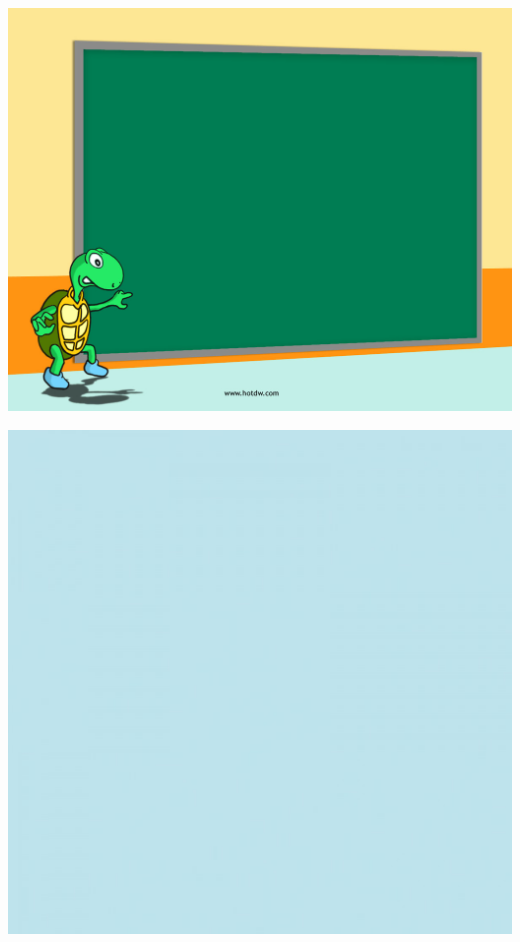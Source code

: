 \documentclass[mathserif, handout]{beamer}
\begin{document}
\usebackgroundtemplate
{
  \includegraphics[width=\paperwidth,height=\paperheight]{./figs/lastpage.jpg}%
}
\begin{frame}


  \vspace{2em}

\end{frame}


\usebackgroundtemplate
{
  \includegraphics[width=\paperwidth,height=\paperheight]{./figs/background.jpg}%
}
\end{document}

